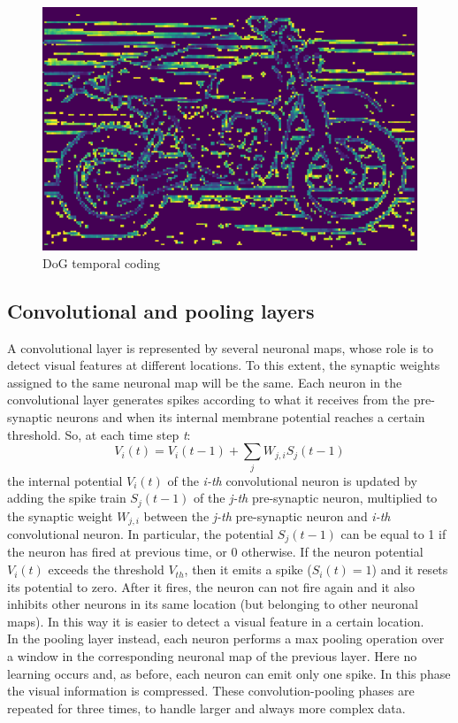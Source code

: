 \documentclass[11pt,a4paper]{scrartcl}
\begin{document}
\begin{figure}[h]
\begin{minipage}[b]{0.498\textwidth}
	\end{minipage}
	\hfill
	\begin{minipage}[b]{0.482\textwidth}
		\includegraphics[width=\textwidth]{images/dog_motor2}
	\end{minipage}
	\caption{DoG temporal coding}
	\label{fig:dog}
\end{figure}

\subsection{Convolutional and pooling layers}

A convolutional layer is represented by several neuronal maps, whose role is to detect visual features at different locations. To this extent, the synaptic weights assigned to the same neuronal map will be the same. Each neuron in the convolutional layer generates spikes according to what it receives from the pre-synaptic neurons and when its internal membrane potential reaches a certain threshold. So, at each time step \textit{t}:
\begin{equation*}
	V_{i}(t) = V_{i}(t-1) + \sum_{j}W_{j,i}S_{j}(t-1)
\end{equation*}
the internal potential $ V_{i}(t) $ of the \textit{i-th} convolutional neuron is updated by adding the spike train $ S_{j}(t-1) $ of the \textit{j-th} pre-synaptic neuron, multiplied to the synaptic weight $ W_{j,i} $ between the \textit{j-th} pre-synaptic neuron and \textit{i-th} convolutional neuron. In particular, the potential $ S_{j}(t-1) $ can be equal to 1 if the neuron has fired at previous time, or 0 otherwise. If the neuron potential $ V_{i}(t) $ exceeds the threshold $ V_{th} $, then it emits a spike ($ S_{i}(t) = 1 $) and it resets its potential to zero. After it fires, the neuron can not fire again and it also inhibits other neurons in its same location (but belonging to other neuronal maps). In this way it is easier to detect a visual feature in a certain location.\\
In the pooling layer instead, each neuron performs a max pooling operation over a window in the corresponding neuronal map of the previous layer. Here no learning occurs and, as before, each neuron can emit only one spike. In this phase the visual information is compressed. These convolution-pooling phases are repeated for three times, to handle larger and always more complex data.
\end{document}
